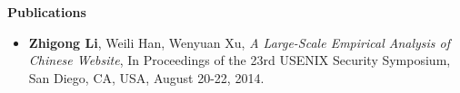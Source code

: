 \documentclass[letterpaper,10pt]{article}
\newcommand{\resheading}[1]{{\large \colorbox{mygrey}{\begin{minipage}{\textwidth}{\textbf{#1 \vphantom{p\^{E}}}}\end{minipage}}}}
\begin{document}



	





\resheading{Publications}
\begin{itemize}
 \item 
 \textbf{Zhigong Li}, Weili Han, Wenyuan Xu, \emph{A Large-Scale Empirical Analysis of Chinese Website}, In Proceedings of the 23rd {USENIX} Security Symposium, San Diego, CA, USA, August 20-22, 2014.
\end{itemize}




\end{document}
